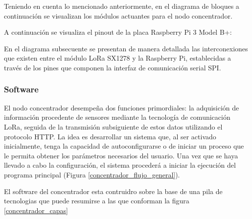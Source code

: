 Teniendo en cuenta lo mencionado anteriormente, en el diagrama de bloques a continuación se visualizan los módulos actuantes para el nodo concentrador.



A continuación se visualiza el pinout de la placa Raspberry Pi 3 Model B+:



En el diagrama subsecuente se presentan de manera detallada las interconexiones que existen entre el módulo LoRa SX1278 y la Raspberry Pi, establecidas a través de los pines que componen la interfaz de comunicación serial SPI. 




\subsubsection{Software}
El nodo concentrador desempeña dos funciones primordiales: la adquisición de información procedente de sensores mediante la tecnología de comunicación LoRa, seguida de la transmisión subsiguiente de estos datos utilizando el protocolo HTTP.
La idea es desarrollar un sistema que, al ser activado inicialmente, tenga la capacidad de autoconfigurarse o de iniciar un proceso que le permita obtener los parámetros necesarios del usuario. Una vez que se haya llevado a cabo la configuración, el sistema procederá a iniciar la ejecución del programa principal (Figura \ref{concentrador_flujo_general}).



El software del concentrador esta contruidro sobre la base de una pila de tecnologias que puede resumirse a las que conforman la figura \ref{concentrador_capas}


